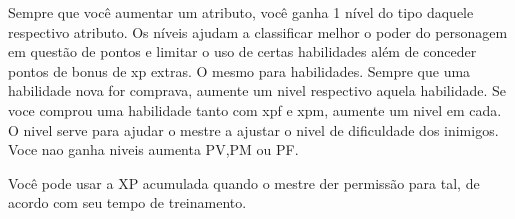 

Sempre que você aumentar um atributo, você ganha 1 nível do tipo daquele respectivo atributo. Os níveis ajudam a classificar melhor o poder do personagem em questão de pontos e limitar o uso de certas habilidades além de conceder pontos de bonus de xp extras. O mesmo para habilidades. Sempre que uma habilidade nova for comprava, aumente um nivel respectivo aquela habilidade. Se voce comprou uma habilidade tanto com xpf e xpm, aumente um nivel em cada. O nivel serve para ajudar o mestre a ajustar o nivel de dificuldade dos inimigos. Voce nao ganha niveis aumenta PV,PM ou PF.

Você pode usar a XP acumulada quando o mestre der permissão para tal, de acordo com seu tempo de treinamento. 





